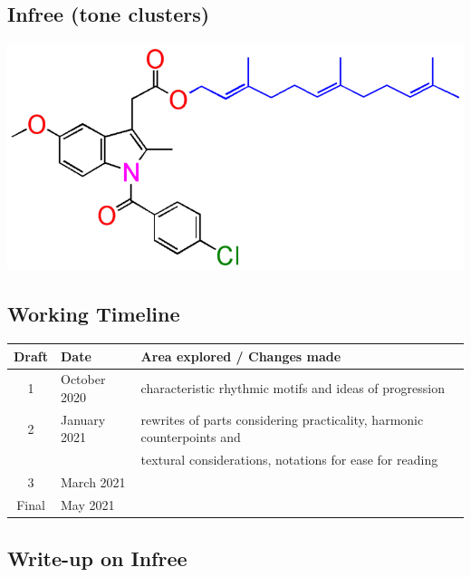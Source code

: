 \documentclass{article}
\begin{document}
\newpage

\begin{center}
\vspace*{\fill}
\LARGE
    \section{Infree (tone clusters)}
    \includegraphics[width=\textwidth]{infree.png}
\vspace*{\fill}
%
\end{center}

\newpage

\subsection{Working Timeline}
\begin{center}
	\def\arraystretch{1.5}
\begin{tabular}{|c|l|l|}
	\hline
	Draft&Date&Area explored / Changes made\\
	\hline
	1&October 2020
    &characteristic rhythmic motifs and ideas of progression\\
	\hline
	2&January 2021
    &rewrites of parts considering practicality, harmonic counterpoints and\\
    &&textural considerations, notations for ease for reading\\
	\hline
	3&March 2021
    &\\
	\hline
	Final&May 2021&\\
	\hline
\end{tabular}
\end{center}

\subsection{Write-up on {\bf Infree}}
\end{document}
